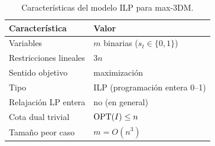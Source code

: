 \begin{table}[htbp]
\centering
\caption{Características del modelo ILP para max-3DM.}
\label{tab:modelo_resumen}
\begin{tabular}{ll}
\toprule
Característica & Valor \\
\midrule
Variables & $m$ binarias ($s_t\in\{0,1\}$) \\
Restricciones lineales & $3n$ \\
Sentido objetivo & maximización \\
Tipo & ILP (programación entera 0--1) \\
Relajación LP entera & no (en general) \\
Cota dual trivial & $\operatorname{OPT}(I)\le n$ \\
Tamaño peor caso & $m=O(n^3)$ \\
\bottomrule
\end{tabular}
\end{table}
